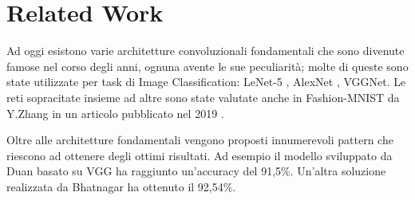 \section{Related Work} \label{sec:related_work}
Ad oggi esistono varie architetture convoluzionali fondamentali che sono divenute famose nel corso degli anni, ognuna avente le sue peculiarità; molte di queste sono state utilizzate per task di Image Classification: LeNet-5 \cite{lecun1998gradient}, AlexNet \cite{krizhevsky2012imagenet}, VGGNet\cite{simonyan2014very}. Le reti sopracitate insieme ad altre sono state valutate anche in Fashion-MNIST da Y.Zhang in un articolo pubblicato nel 2019 \cite{zhang2019evaluation}.\par
Oltre alle architetture fondamentali vengono proposti innumerevoli pattern che riescono ad ottenere degli ottimi risultati. Ad esempio il modello sviluppato da Duan \etal{} \cite{duan2019image} basato su VGG ha raggiunto un'accuracy del 91,5\%. Un'altra soluzione realizzata da Bhatnagar \etal{} \cite{bhatnagar2017classification} ha ottenuto il 92,54\%.